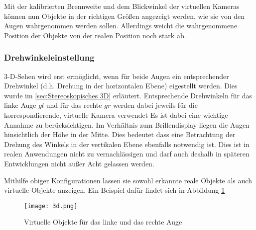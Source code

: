 %
Mit der kalibrierten Brennweite und dem Blickwinkel der virtuellen Kameras können nun Objekte in der richtigen Größen angezeigt werden, wie sie von den Augen wahrgenommen werden sollen. Allerdings weicht die wahrgenommene Position der Objekte von der realen Position noch stark ab. 

\subsubsection{Drehwinkeleinstellung}
3-D-Sehen wird erst ermöglicht, wenn für beide Augen ein entsprechender Drehwinkel (d.h. Drehung in der horizontalen Ebene) eigestellt werden. Dies wurde im \ref{sec:Stereoskopisches 3D} erläutert.  Entsprechende Drehwinkeln für das linke Auge $gl$ und für das rechte $gr$ werden dabei jeweils für die korrespondierende, virtuelle Kamera verwendet
Es ist dabei eine wichtige Annahme zu berücksichtigen. Im Verhältnis zum Brillendisplay liegen die Augen hinsichtlich der Höhe in der Mitte. Dies bedeutet dass eine Betrachtung der Drehung des Winkels in der vertikalen Ebene ebenfalls notwendig ist. Dies ist in realen Anwendungen nicht zu vernachlässigen und darf auch deshalb in späteren Entwicklungen nicht außer Acht gelassen werden.

Mithilfe obiger Konfigurationen lassen sie sowohl erkannte reale Objekte als auch virtuelle Objekte anzeigen.  Ein Beispiel dafür findet sich in Abbildung \ref{fig:Virtuelle Quadrate aus Prezi}

\begin{figure}[h]
   \centering
   \texttt{[image: 3d.png]}
   \caption{Virtuelle Objekte für das linke und das rechte Auge}
   \label{fig:Virtuelle Quadrate aus Prezi}
\end{figure}


